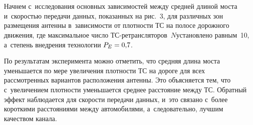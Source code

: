 \begin{multicols}{2}
\begin{figure*}[b] %
  \vspace*{-6pt}
    \begin{minipage}[t]{80mm}
\begin{center}
   \mbox{%
\epsfxsize=78.898mm
}
\end{center}
\vspace*{-9pt}
  \end{minipage}
   \hfill  
  \vspace*{-6pt}
  \begin{minipage}[t]{80mm}
\begin{center}
   \mbox{%
\epsfxsize=79mm
}
\end{center}
\vspace*{-9pt}
    \end{minipage}
  \end{figure*}
  
  

     Начнем с~исследования основных зависимостей между средней длиной 
мос\-та и~ско\-ростью передачи данных, показанных на рис.~3, для различных 
зон размещения антенны в~за\-ви\-си\-мости от плот\-ности ТС
на полосе дорожного движения, где максимальное чис\-ло  
ТС-ре\-транс\-ля\-то\-ров~$N$установлено рав\-ным~10, а~степень внед\-ре\-ния 
технологии $P_E\hm= 0{,}7$.
     


     По результатам эксперимента мож\-но отметить, что средняя длина 
моста уменьшается по мере увеличения плот\-ности ТС на дороге для всех 
рас\-смот\-рен\-ных вариантов расположения антенны. Это объясняется тем, что 
с~увеличением плот\-ности уменьшается среднее расстояние между ТС. 
Обратный эффект наблюдается для ско\-рости передачи данных, и~это связано 
с~более короткими расстояниями меж\-ду автомобилями, а~следовательно, 
лучшим качеством канала.
     

\end{multicols}
